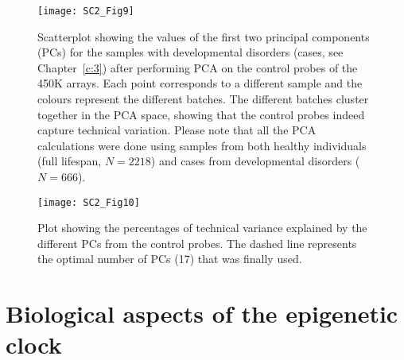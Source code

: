 \begin{figure}[htbp!] 
	\centering    
	\texttt{[image: SC2\_Fig9]}
	\caption[PCA on the array control probes captures batch effects: cases]{Scatterplot showing the values of the first two principal components (PCs) for the samples with developmental disorders (cases, see Chapter~\ref{c:3}) after performing PCA on the control probes of the 450K arrays. Each point corresponds to a different sample and the colours represent the different batches. The different batches cluster together in the PCA space, showing that the control probes indeed capture technical variation. Please note that all the PCA calculations were done using samples from both healthy individuals (full lifespan, $N=2218$) and cases from developmental disorders ($N=666$).}
	\label{fig:sc2_fig9}
\end{figure}

\begin{figure}[htbp!] 
	\vspace*{5mm}
	\centering    
	\texttt{[image: SC2\_Fig10]}
	\caption[Variance explained by the different principal components during batch effect correction]{Plot showing the percentages of technical variance explained by the different PCs from the control probes. The dashed line represents the optimal number of PCs (17) that was finally used.}
	\label{fig:sc2_fig10}
\end{figure}

\clearpage

\renewcommand{\thesection}{S.2}   
\section{Biological aspects of the epigenetic clock}

\renewcommand\thefigure{S2.\arabic{figure}}
\renewcommand\thetable{S2.\arabic{table}}        
\vspace{10 mm}


